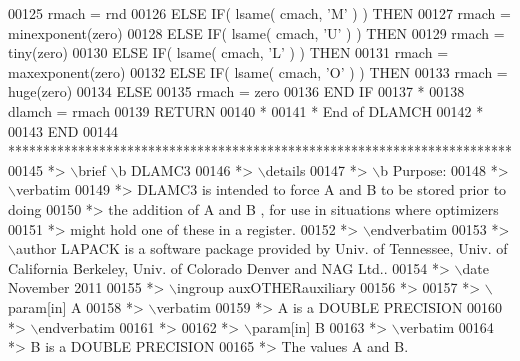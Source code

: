 \begin{DoxyCode}
00125          rmach = rnd
00126       \textcolor{keywordflow}{ELSE} \textcolor{keywordflow}{IF}( lsame( cmach, \textcolor{stringliteral}{'M'} ) ) \textcolor{keywordflow}{THEN}
00127          rmach = minexponent(zero)
00128       \textcolor{keywordflow}{ELSE} \textcolor{keywordflow}{IF}( lsame( cmach, \textcolor{stringliteral}{'U'} ) ) \textcolor{keywordflow}{THEN}
00129          rmach = tiny(zero)
00130       \textcolor{keywordflow}{ELSE} \textcolor{keywordflow}{IF}( lsame( cmach, \textcolor{stringliteral}{'L'} ) ) \textcolor{keywordflow}{THEN}
00131          rmach = maxexponent(zero)
00132       \textcolor{keywordflow}{ELSE} \textcolor{keywordflow}{IF}( lsame( cmach, \textcolor{stringliteral}{'O'} ) ) \textcolor{keywordflow}{THEN}
00133          rmach = huge(zero)
00134       \textcolor{keywordflow}{ELSE}
00135          rmach = zero
00136 \textcolor{keywordflow}{      END IF}
00137 \textcolor{comment}{*}
00138       dlamch = rmach
00139       \textcolor{keywordflow}{RETURN}
00140 \textcolor{comment}{*}
00141 \textcolor{comment}{*     End of DLAMCH}
00142 \textcolor{comment}{*}
00143 \textcolor{keyword}{      END}
00144 \textcolor{comment}{************************************************************************}
00145 \textcolor{comment}{*> \(\backslash\)brief \(\backslash\)b DLAMC3}
00146 \textcolor{comment}{*> \(\backslash\)details}
00147 \textcolor{comment}{*> \(\backslash\)b Purpose:}
00148 \textcolor{comment}{*> \(\backslash\)verbatim}
00149 \textcolor{comment}{*> DLAMC3  is intended to force  A  and  B  to be stored prior to doing}
00150 \textcolor{comment}{*> the addition of  A  and  B ,  for use in situations where optimizers}
00151 \textcolor{comment}{*> might hold one of these in a register.}
00152 \textcolor{comment}{*> \(\backslash\)endverbatim}
00153 \textcolor{comment}{*> \(\backslash\)author LAPACK is a software package provided by Univ. of Tennessee, Univ. of California Berkeley, Univ.
       of Colorado Denver and NAG Ltd..}
00154 \textcolor{comment}{*> \(\backslash\)date November 2011}
00155 \textcolor{comment}{*> \(\backslash\)ingroup auxOTHERauxiliary}
00156 \textcolor{comment}{*>}
00157 \textcolor{comment}{*> \(\backslash\)param[in] A}
00158 \textcolor{comment}{*> \(\backslash\)verbatim}
00159 \textcolor{comment}{*>          A is a DOUBLE PRECISION}
00160 \textcolor{comment}{*> \(\backslash\)endverbatim}
00161 \textcolor{comment}{*>}
00162 \textcolor{comment}{*> \(\backslash\)param[in] B}
00163 \textcolor{comment}{*> \(\backslash\)verbatim}
00164 \textcolor{comment}{*>          B is a DOUBLE PRECISION}
00165 \textcolor{comment}{*>          The values A and B.}

\end{DoxyCode}
